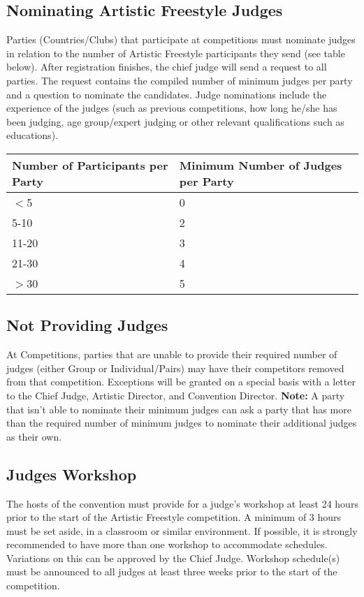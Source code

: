 \subsection{Nominating Artistic Freestyle Judges \label{subsec:freestyle_judging-panel_nominating-freestyle-judges}}
Parties (Countries/Clubs) that participate at competitions must nominate judges in relation to the number of Artistic Freestyle participants they send (see table below).
After registration finishes, the chief judge will send a request to all parties.
The request contains the compiled number of minimum judges per party and a question to nominate the candidates.
Judge nominations include the experience of the judges (such as previous competitions, how long he/she has been judging, age group/expert judging or other relevant qualifications such as educations).

\begin{tabular}{|l|l|}
\hline
\textbf{Number of Participants per Party} & \textbf{Minimum Number of Judges per Party} \\
\hline
$<$5 & 0 \\
\hline
5-10 & 2 \\
\hline
11-20 & 3 \\
\hline
21-30 & 4 \\
\hline
$>$30 & 5 \\
\hline
\end{tabular}

\subsection{Not Providing Judges}
At Competitions, parties that are unable to provide their required number of judges (either Group or Individual/Pairs) may have their competitors removed from that competition.
Exceptions will be granted on a special basis with a letter to the Chief Judge, Artistic Director, and Convention Director.
\textbf{Note:} A party that isn't able to nominate their minimum judges can ask a party that has more than the required number of minimum judges to nominate their additional judges as their own.

\subsection{Judges Workshop}
The hosts of the convention must provide for a judge's workshop at least 24 hours prior to the start of the Artistic Freestyle competition.
A minimum of 3 hours must be set aside, in a classroom or similar environment.
If possible, it is strongly recommended to have more than one workshop to accommodate schedules.
Variations on this can be approved by the Chief Judge.
Workshop schedule(s) must be announced to all judges at least three weeks prior to the start of the competition.

